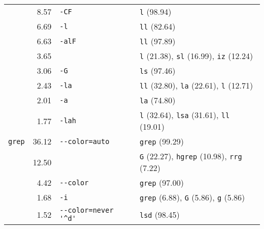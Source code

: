 \begin{table*}
\begin{tabular}{lrll}
                     &   \num{8.57} &                \verb|-CF| &                                                                  \verb|l| (\num{98.94}) \\
                     &   \num{6.69} &                 \verb|-l| &                                                                 \verb|ll| (\num{82.64}) \\
                     &   \num{6.63} &               \verb|-alF| &                                                                 \verb|ll| (\num{97.89}) \\
                     &   \num{3.65} &                   \verb|| &      \verb|l| (\num{21.38}), \verb|sl| (\num{16.99}), \verb|iz| (\num{12.24}) \\
                     &   \num{3.06} &                 \verb|-G| &                                                                 \verb|ls| (\num{97.46}) \\
                     &   \num{2.43} &                \verb|-la| &      \verb|ll| (\num{32.80}), \verb|la| (\num{22.61}), \verb|l| (\num{12.71}) \\
                     &   \num{2.01} &                 \verb|-a| &                                                                 \verb|la| (\num{74.80}) \\
                     &   \num{1.77} &               \verb|-lah| &     \verb|l| (\num{32.64}), \verb|lsa| (\num{31.61}), \verb|ll| (\num{19.01}) \\
        \midrule
         \verb|grep| &  \num{36.12} &       \verb|--color=auto| &                                                               \verb|grep| (\num{99.29}) \\
                     &  \num{12.50} &                   \verb|| &   \verb|G| (\num{22.27}), \verb|hgrep| (\num{10.98}), \verb|rrg| (\num{7.22}) \\
                     &   \num{4.42} &            \verb|--color| &                                                               \verb|grep| (\num{97.00}) \\
                     &   \num{1.68} &                 \verb|-i| &        \verb|grep| (\num{6.88}), \verb|G| (\num{5.86}), \verb|g| (\num{5.86}) \\
                     &   \num{1.52} & \verb|--color=never '^d'| &                                                                \verb|lsd| (\num{98.45}) \\
        \bottomrule
    \end{tabular}
\end{table*}

